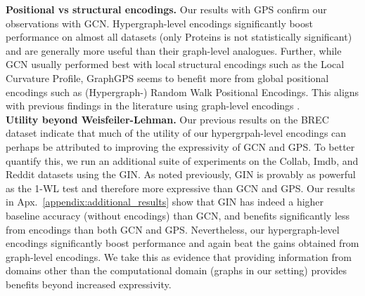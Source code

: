 \noindent \textbf{Positional vs structural encodings.} Our results with GPS confirm our observations with GCN. Hypergraph-level encodings significantly boost performance on almost all datasets (only Proteins is not statistically significant) and are generally more useful than their graph-level analogues. Further, while GCN usually performed best with local structural encodings such as the Local Curvature Profile, GraphGPS seems to benefit more from global positional encodings such as (Hypergraph-) Random Walk Positional Encodings. This aligns with previous findings in the literature using graph-level encodings \citep{fesser2023effective}.\\

\noindent \textbf{Utility beyond Weisfeiler-Lehman.} Our previous results on the BREC dataset indicate that much of the utility of our hypergrpah-level encodings can perhaps be attributed to improving the expressivity of GCN and GPS. To better quantify this, we run an additional suite of experiments on the Collab, Imdb, and Reddit datasets using the GIN. As noted previously, GIN is provably as powerful as the 1-WL test and therefore more expressive than GCN and GPS. Our results in Apx.~\ref{appendix:additional_results} show that GIN has indeed a higher baseline accuracy (without encodings) than GCN, and benefits significantly less from encodings than both GCN and GPS. Nevertheless, our hypergraph-level encodings significantly boost performance and again beat the gains obtained from graph-level encodings. We take this as evidence that providing information from domains other than the computational domain (graphs in our setting) provides benefits beyond increased expressivity.




